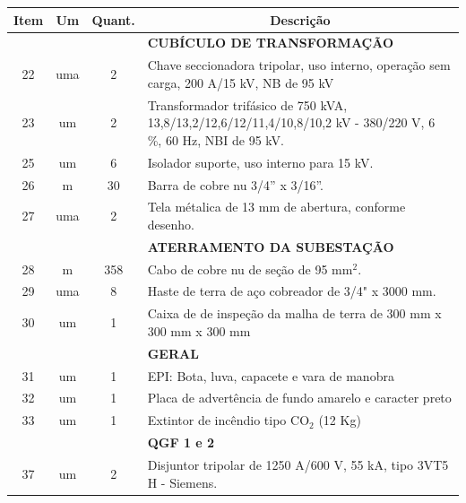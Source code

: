 	
	\begin{table}[htbp]
	  \centering
	    \begin{sideways}
	    \begin{tabular}{cccl}
	    \toprule
	    \textbf{Item}  & \textbf{Um}    & \textbf{Quant.} & \multicolumn{1}{c}{\textbf{Descrição}} \\
	    \midrule
	           &       &       & \textbf{CUBÍCULO DE TRANSFORMAÇÃO} \\
	    22    & uma   & 2     & Chave seccionadora tripolar, uso interno, operação sem carga, 200 A/15 kV, NB de 95 kV  \\
	    23    & um    & 2     & Transformador trifásico de 750 kVA, 13,8/13,2/12,6/12/11,4/10,8/10,2 kV - 380/220 V, 6 \%, 60 Hz, NBI de 95 kV. \\
	    25    & um    & 6     & Isolador suporte, uso interno para 15 kV. \\
	    26    & m     & 30    & Barra de cobre nu 3/4” x 3/16”. \\
	    27    & uma   & 2     & Tela métalica de 13 mm de abertura,  conforme desenho. \\
	          &       &       & \textbf{ATERRAMENTO DA SUBESTAÇÃO} \\
	    28    & m     & 358   & Cabo de cobre nu de seção de 95 mm$^{2}$. \\
	    29    & uma   & 8     & Haste de terra de aço cobreador de 3/4" x 3000 mm. \\
	    30    & um    & 1     & Caixa de  de inspeção da malha  de terra de 300 mm x 300 mm x 300 mm \\
	          &       &       & \textbf{GERAL} \\
	    31    & um    & 1     & EPI: Bota, luva, capacete e vara de manobra \\
	    32    & um    & 1     & Placa de advertência de fundo amarelo e caracter preto \\
	    33    & um    & 1     & Extintor de incêndio tipo CO$_{2}$ (12 Kg) \\
	          &       &       & \textbf{QGF 1 e 2} \\
	        37    & um    & 2     & Disjuntor tripolar de 1250 A/600 V, 55 kA, tipo 3VT5 H - Siemens. \\
	    \bottomrule
	    \end{tabular}
	    \end{sideways}
	\end{table}
	
	
	
	
	